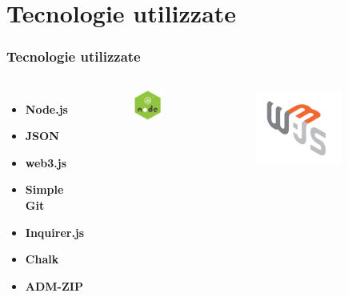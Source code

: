\documentclass{beamer}
\begin{document}
\section{Tecnologie utilizzate}

\begin{frame}
	\frametitle{Tecnologie utilizzate}
	\begin{columns}
		\begin{itemize}
			\item \textbf{Node.js}
			\item \textbf{JSON}
			\item \textbf{web3.js}
			\item \textbf{Simple Git}
			\item \textbf{Inquirer.js}
			\item \textbf{Chalk}
			\item \textbf{ADM-ZIP}
		\end{itemize}
		\centering
		\begin{figure}
			\includegraphics[width=0.7\textwidth]{figures/node.png}
		\end{figure}
		\begin{figure}
			\includegraphics[width=0.7\textwidth]{figures/web3.jpg}

\end{figure}
\end{columns}
\end{frame}
\end{document}
